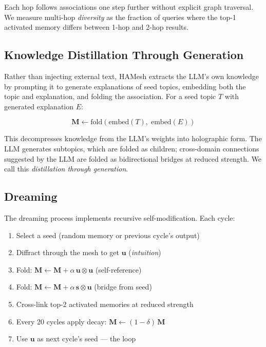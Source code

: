 \documentclass[11pt]{article}
\begin{document}
Each hop follows associations one step further without explicit graph traversal.
We measure multi-hop \emph{diversity} as the fraction of queries where the
top-1 activated memory differs between 1-hop and 2-hop results.

\subsection{Knowledge Distillation Through Generation}

Rather than injecting external text, HAMesh extracts the LLM's own knowledge by
prompting it to generate explanations of seed topics, embedding both the topic
and explanation, and folding the association. For a seed topic $T$ with
generated explanation $E$:

\begin{equation}
  \mathbf{M} \leftarrow \text{fold}(\text{embed}(T),\; \text{embed}(E))
\end{equation}

This decompresses knowledge from the LLM's weights into holographic form. The
LLM generates subtopics, which are folded as children; cross-domain connections
suggested by the LLM are folded as bidirectional bridges at reduced strength.
We call this \emph{distillation through generation}.

\subsection{Dreaming}

The dreaming process implements recursive self-modification. Each cycle:
\begin{enumerate}
  \item Select a seed (random memory or previous cycle's output)
  \item Diffract through the mesh to get $\mathbf{u}$ (\emph{intuition})
  \item Fold: $\mathbf{M} \leftarrow \mathbf{M} + \alpha\,\mathbf{u} \otimes \mathbf{u}$ \quad (self-reference)
  \item Fold: $\mathbf{M} \leftarrow \mathbf{M} + \alpha\,\mathbf{s} \otimes \mathbf{u}$ \quad (bridge from seed)
  \item Cross-link top-2 activated memories at reduced strength
  \item Every 20 cycles apply decay: $\mathbf{M} \leftarrow (1-\delta)\,\mathbf{M}$
  \item Use $\mathbf{u}$ as next cycle's seed --- the loop
\end{enumerate}
\end{document}

